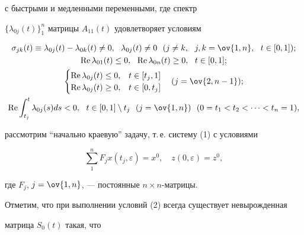 с быстрыми и медленными переменными, где спектр 


$\{\lambda_{0j}(t)\}^n_1$ матрицы $A_{11}(t)$ удовлетворяет условиям 


\begin{gather} 


\sigma_{j k}(t)\equiv\lambda_{0j}(t)- 


\lambda_{0k}(t)\ne0,\ \ \lambda_{0j}(t)\ne0 


\ \ (j\ne k,\ \ j,k=\ov{1,n},\ \ t\in[0,1]);\notag \\ 


% 


\re\lambda_{01}(t)\le0,\ \ \re\lambda_{0n}(t)\ge0, 


\ \ t\in[0,1];\notag\\ 


% 


\begin{cases} 


\re\lambda_{0j}(t)\le0, & t\in[t_j,1]\\ 


\re\lambda_{0j}(t)\ge0, & t\in[0,t_j] 


\end{cases} 


\quad (j=\ov{2,n-1}); 


\\ 


% 


\re\int^t_{t_j} \lambda_{0j}(s)d s<0,\ \ t\in[0,1]\setminus t_j 


\ \ (j=\ov{1,n})\ \ (0=t_1<t_2<\dotsb<t_n=1),\notag 


\end{gather} 


рассмотрим ``начально краевую'' задачу, т.\,е. систему (1) с условиями 


\begin{equation} 


\sum^n_1 F_j x(t_j,\varepsilon)=x^0,\quad 


z(0,\varepsilon)=z^0, 


\end{equation} 


где $F_j$, $j=\ov{1,n}$, --- постоянные $n\times n$-матрицы. 


 


Отметим, что при выполнении условий (2) всегда существует невырожденная 


матрица $S_0(t)$ такая, что 


